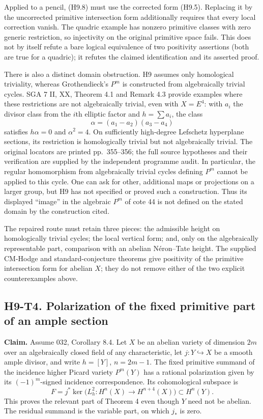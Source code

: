 Applied to a pencil, (H9.8) must use the corrected form (H9.5). Replacing
it by the uncorrected primitive intersection form additionally requires
that every local correction vanish. The quadric example has nonzero
primitive classes with zero generic restriction, so injectivity on the
original primitive space fails. This does not by itself refute a bare
logical equivalence of two positivity assertions (both are true for a
quadric); it refutes the claimed identification and its asserted proof.

There is also a distinct domain obstruction. H9 assumes only homological
triviality, whereas Grothendieck's $P^m$ is constructed from algebraically
trivial cycles. SGA 7 II, XX, Theorem 4.1 and Remark 4.3 provide examples
where these restrictions are not algebraically trivial, even with
$X=E^4$: with $a_i$ the divisor class from the $i$th elliptic factor and
$h=\sum a_i$, the class
\[
 \alpha=(a_1-a_2)(a_3-a_4)
\]
satisfies $h\alpha=0$ and $\alpha^2=4$. On sufficiently high-degree
Lefschetz hyperplane sections, its restriction is homologically trivial
but not algebraically trivial. The original locators are printed
pp.~355--356; the full source hypotheses and their verification are
supplied by the independent programme audit. In particular, the regular
homomorphism from algebraically trivial cycles defining $P^m$ cannot be
applied to this cycle. One can ask for other, additional maps or
projections on a larger group, but H9 has not specified or proved such a
construction. Thus its displayed ``image'' in the algebraic $P^m$ of
cote 44 is not defined on the stated domain by the construction cited.

The repaired route must retain three pieces: the admissible height on
homologically trivial cycles; the local vertical form; and, only on the
algebraically representable part, comparison with an abelian
N\'eron--Tate height. The supplied CM-Hodge and standard-conjecture theorems
give positivity of the primitive intersection form for abelian $X$; they
do not remove either of the two explicit counterexamples above.

\subsection*{H9-T4. Polarization of the fixed primitive part of an ample section}

\textbf{Claim.} Assume 032, Corollary 8.4. Let $X$ be an abelian variety
of dimension $2m$ over an algebraically closed field of any characteristic,
let $j:Y\hookrightarrow X$ be a smooth ample divisor, and write
$h=[Y]$, $n=2m-1$. The fixed primitive summand of the incidence higher
Picard variety $P^m(Y)$ has a rational polarization given by its
$(-1)^m$-signed incidence correspondence. Its cohomological subspace is
\[
 F=j^*\ker\bigl(L_h^2:H^{n}(X)\longrightarrow H^{n+4}(X)\bigr)
       \subset H^n(Y).
\]
This proves the relevant part of Theorem 4 even though $Y$ need not be
abelian. The residual summand is the variable part, on which $j_*$ is zero.

